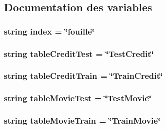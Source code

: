 \subsection{Documentation des variables}
\hypertarget{namespaceBDD_a5b93a013f8d46f91f8d7b0fc102a42e7}{
\subsubsection[{index}]{\setlength{\rightskip}{0pt plus 5cm}string index = \char`\"{}fouille\char`\"{}}}\label{namespaceBDD_a5b93a013f8d46f91f8d7b0fc102a42e7}
\hypertarget{namespaceBDD_ab065e06b98ff8f50dcdabe5715c5b710}{
\subsubsection[{table\-Credit\-Test}]{\setlength{\rightskip}{0pt plus 5cm}string table\-Credit\-Test = \char`\"{}Test\-Credit\char`\"{}}}\label{namespaceBDD_ab065e06b98ff8f50dcdabe5715c5b710}
\hypertarget{namespaceBDD_a5453a62b7989a6ea0d9d1f4016411323}{
\subsubsection[{table\-Credit\-Train}]{\setlength{\rightskip}{0pt plus 5cm}string table\-Credit\-Train = \char`\"{}Train\-Credit\char`\"{}}}\label{namespaceBDD_a5453a62b7989a6ea0d9d1f4016411323}
\hypertarget{namespaceBDD_a1a3347461ee00b8dba8e995423d6acea}{
\subsubsection[{table\-Movie\-Test}]{\setlength{\rightskip}{0pt plus 5cm}string table\-Movie\-Test = \char`\"{}Test\-Movie\char`\"{}}}\label{namespaceBDD_a1a3347461ee00b8dba8e995423d6acea}
\hypertarget{namespaceBDD_a69bea8ff9373a0baf5bbf3df09f7a3b0}{
\subsubsection[{table\-Movie\-Train}]{\setlength{\rightskip}{0pt plus 5cm}string table\-Movie\-Train = \char`\"{}Train\-Movie\char`\"{}}}\label{namespaceBDD_a69bea8ff9373a0baf5bbf3df09f7a3b0}
